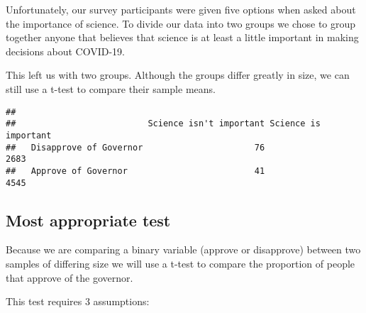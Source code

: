 \documentclass[
]{article}
\newenvironment{Shaded}{\begin{snugshade}}{\end{snugshade}}
\newcommand{\DecValTok}[1]{\textcolor[rgb]{0.00,0.00,0.81}{#1}}
\newcommand{\NormalTok}[1]{#1}
\newcommand{\OperatorTok}[1]{\textcolor[rgb]{0.81,0.36,0.00}{\textbf{#1}}}
\newcommand{\StringTok}[1]{\textcolor[rgb]{0.31,0.60,0.02}{#1}}
\begin{document}
Unfortunately, our survey participants were given five options when
asked about the importance of science. To divide our data into two
groups we chose to group together anyone that believes that science is
at least a little important in making decisions about COVID-19.

\begin{Shaded}
\end{Shaded}

This left us with two groups. Although the groups differ greatly in
size, we can still use a t-test to compare their sample means.

\begin{verbatim}
##                         
##                          Science isn't important Science is important
##   Disapprove of Governor                      76                 2683
##   Approve of Governor                         41                 4545
\end{verbatim}

\hypertarget{most-appropriate-test}{%
\subsection{Most appropriate test}\label{most-appropriate-test}}

Because we are comparing a binary variable (approve or disapprove)
between two samples of differing size we will use a t-test to compare
the proportion of people that approve of the governor.

This test requires 3 assumptions:
\end{document}
